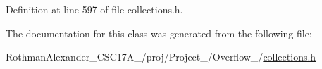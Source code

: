 Definition at line 597 of file collections.\+h.



The documentation for this class was generated from the following file\+:\begin{DoxyCompactItemize}
\item 
Rothman\+Alexander\+\_\+\+C\+S\+C17\+A\+\_/proj/\+Project\+\_/\+Overflow\+\_/\hyperlink{collections_8h}{collections.\+h}\end{DoxyCompactItemize}
